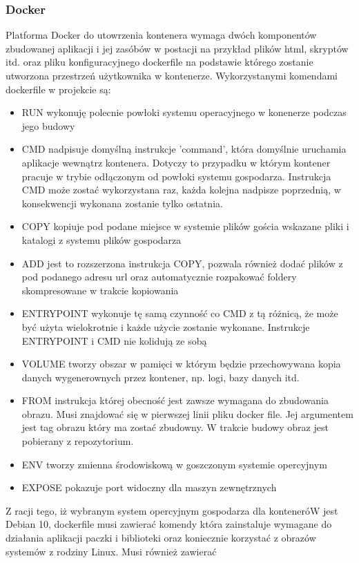\documentclass[polish, a4paper, 12pt, oneside]{book}
\begin{document}
\subsubsection{Docker}
Platforma Docker do utowrzenia kontenera wymaga dwóch komponentów zbudowanej aplikacji i jej zasóbów w postacji na przykład plików html, skryptów itd. oraz pliku konfiguracyjnego dockerfile na podstawie którego zostanie utworzona przestrzeń użytkownika w kontenerze. Wykorzystanymi komendami dockerfile w projekcie są:
\begin{itemize}[noitemsep]
	\item RUN wykonuję polecnie powłoki systemu operacyjnego w konenerze podczas jego budowy
	\item CMD nadpisuje domyślną instrukcje 'command', która domyślnie uruchamia aplikacje wewnątrz kontenera. Dotyczy to przypadku w którym kontener pracuje w trybie odłączonym od powłoki systemu gospodarza. Instrukcja CMD może zostać wykorzystana raz, każda kolejna nadpisze poprzednią, w konsekwencji wykonana zostanie tylko ostatnia.
	\item COPY kopiuje pod podane miejsce w systemie plików gościa wskazane pliki i katalogi z systemu plików gospodarza
	\item ADD jest to rozszerzona instrukcja COPY, pozwala również dodać plików z pod podanego adresu url oraz automatycznie rozpakować foldery skompresowane w trakcie kopiowania
	\item ENTRYPOINT wykonuje tę samą czynność co CMD z tą różnicą, że może być użyta wielokrotnie i każde użycie zostanie wykonane. Instrukcje ENTRYPOINT i CMD nie kolidują ze sobą
	\item VOLUME tworzy obszar w pamięci w którym będzie przechowywana kopia danych wygenerownych przez kontener, np. logi, bazy danych itd.
	\item FROM instrukcja której obecność jest zawsze wymagana do zbudowania obrazu. Musi znajdować się w pierwszej linii pliku docker file. Jej argumentem jest tag obrazu który ma zostać zbudowny. W trakcie budowy obraz jest pobierany z repozytorium.
	\item ENV tworzy zmienna środowiskową w goszczonym systemie opercyjnym
	\item EXPOSE pokazuje port widoczny dla maszyn zewnętrznych
\end{itemize}
Z racji tego, iż wybranym system opercyjnym gospodarza dla konteneróW jest Debian 10, dockerfile musi zawierać komendy która zainstaluje wymagane do działania aplikacji paczki i biblioteki oraz koniecznie korzystać z obrazów systemów z rodziny Linux. Musi również zawierać
\end{document}

